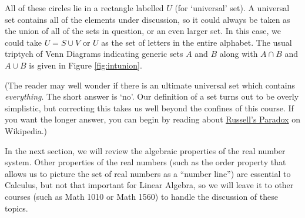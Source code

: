 \medskip

All of these circles lie in a rectangle labelled $U$ (for `universal' set).  A universal set contains all of the elements under discussion, so it could always be taken as the union of all of the sets in question, or an even larger set.  In this case, we could take $U = S \cup V$ or $U$ as the set of letters in the entire alphabet.    The usual triptych of Venn Diagrams indicating generic sets $A$ and  $B$ along with $A \cap B$ and $A \cup B$ is given in Figure \ref{fig:intunion}.

(The reader may well wonder if there is an ultimate universal set which contains \textit{everything}.  The short answer is `no'. Our definition of a set turns out to be overly simplistic, but correcting this takes us well beyond the confines of this course. If you want the longer answer, you can begin by reading about \href{http://en.wikipedia.org/wiki/Russell's_paradox}{\underline{Russell's Paradox}} on Wikipedia.)





In the next section, we will review the algebraic properties of the real number system. Other properties of the real numbers (such as the order property that allows us to picture the set of real numbers as a ``number line'') are essential to Calculus, but not that important for Linear Algebra, so we will leave it to other courses (such as Math 1010 or Math 1560) to handle the discussion of these topics.

\clearpage
